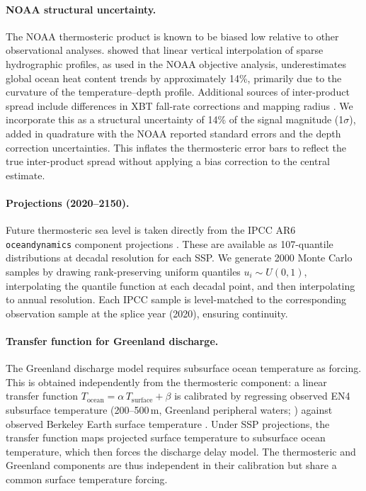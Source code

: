 \documentclass[11pt]{article}
\begin{document}
\paragraph{NOAA structural uncertainty.}
The NOAA thermosteric product is known to be biased low relative to other observational analyses. \citet{Li2022} showed that linear vertical interpolation of sparse hydrographic profiles, as used in the NOAA objective analysis, underestimates global ocean heat content trends by approximately 14\%, primarily due to the curvature of the temperature--depth profile. Additional sources of inter-product spread include differences in XBT fall-rate corrections \citep{Cheng2014_xbt} and mapping radius \citep{Cheng2017}. We incorporate this as a structural uncertainty of 14\% of the signal magnitude (1$\sigma$), added in quadrature with the NOAA reported standard errors and the depth correction uncertainties. This inflates the thermosteric error bars to reflect the true inter-product spread without applying a bias correction to the central estimate.

\paragraph{Projections (2020--2150).}
Future thermosteric sea level is taken directly from the IPCC AR6 \texttt{oceandynamics} component projections \citep{Fox-Kemper2021, Kopp2023}. These are available as 107-quantile distributions at decadal resolution for each SSP. We generate 2000 Monte Carlo samples by drawing rank-preserving uniform quantiles $u_i \sim U(0,1)$, interpolating the quantile function at each decadal point, and then interpolating to annual resolution. Each IPCC sample is level-matched to the corresponding observation sample at the splice year (2020), ensuring continuity.

\paragraph{Transfer function for Greenland discharge.}
The Greenland discharge model requires subsurface ocean temperature as forcing. This is obtained independently from the thermosteric component: a linear transfer function $T_{\mathrm{ocean}} = \alpha\, T_{\mathrm{surface}} + \beta$ is calibrated by regressing observed EN4 subsurface temperature (200--500\,m, Greenland peripheral waters; \citealp{Good2013}) against observed Berkeley Earth surface temperature \citep{Rohde2020}. Under SSP projections, the transfer function maps projected surface temperature to subsurface ocean temperature, which then forces the discharge delay model. The thermosteric and Greenland components are thus independent in their calibration but share a common surface temperature forcing.
\end{document}
